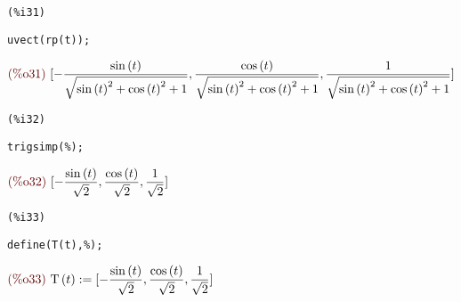 \documentclass[12pt]{article}
\begin{document}
\noindent
\begin{minipage}[t]{8ex}{\color{red}\bf
\begin{verbatim}
(%i31) 
\end{verbatim}}
\end{minipage}
\begin{minipage}[t]{\textwidth}{\color{blue}
\begin{verbatim}
uvect(rp(t));
\end{verbatim}}
\end{minipage}
\begin{math}\displaystyle
\parbox{8ex}{\color{labelcolor}(\%o31) }
[-\frac{\mathrm{sin}\left( t\right) }{\sqrt{{\mathrm{sin}\left( t\right) }^{2}+{\mathrm{cos}\left( t\right) }^{2}+1}},\frac{\mathrm{cos}\left( t\right) }{\sqrt{{\mathrm{sin}\left( t\right) }^{2}+{\mathrm{cos}\left( t\right) }^{2}+1}},\frac{1}{\sqrt{{\mathrm{sin}\left( t\right) }^{2}+{\mathrm{cos}\left( t\right) }^{2}+1}}]
\end{math}

\noindent
\begin{minipage}[t]{8ex}{\color{red}\bf
\begin{verbatim}
(%i32) 
\end{verbatim}}
\end{minipage}
\begin{minipage}[t]{\textwidth}{\color{blue}
\begin{verbatim}
trigsimp(%);
\end{verbatim}}
\end{minipage}
\begin{math}\displaystyle
\parbox{8ex}{\color{labelcolor}(\%o32) }
[-\frac{\mathrm{sin}\left( t\right) }{\sqrt{2}},\frac{\mathrm{cos}\left( t\right) }{\sqrt{2}},\frac{1}{\sqrt{2}}]
\end{math}

\noindent
\begin{minipage}[t]{8ex}{\color{red}\bf
\begin{verbatim}
(%i33) 
\end{verbatim}}
\end{minipage}
\begin{minipage}[t]{\textwidth}{\color{blue}
\begin{verbatim}
define(T(t),%);
\end{verbatim}}
\end{minipage}
\begin{math}\displaystyle
\parbox{8ex}{\color{labelcolor}(\%o33) }
\mathrm{T}\left( t\right) :=[-\frac{\mathrm{sin}\left( t\right) }{\sqrt{2}},\frac{\mathrm{cos}\left( t\right) }{\sqrt{2}},\frac{1}{\sqrt{2}}]
\end{math}
\end{document}
